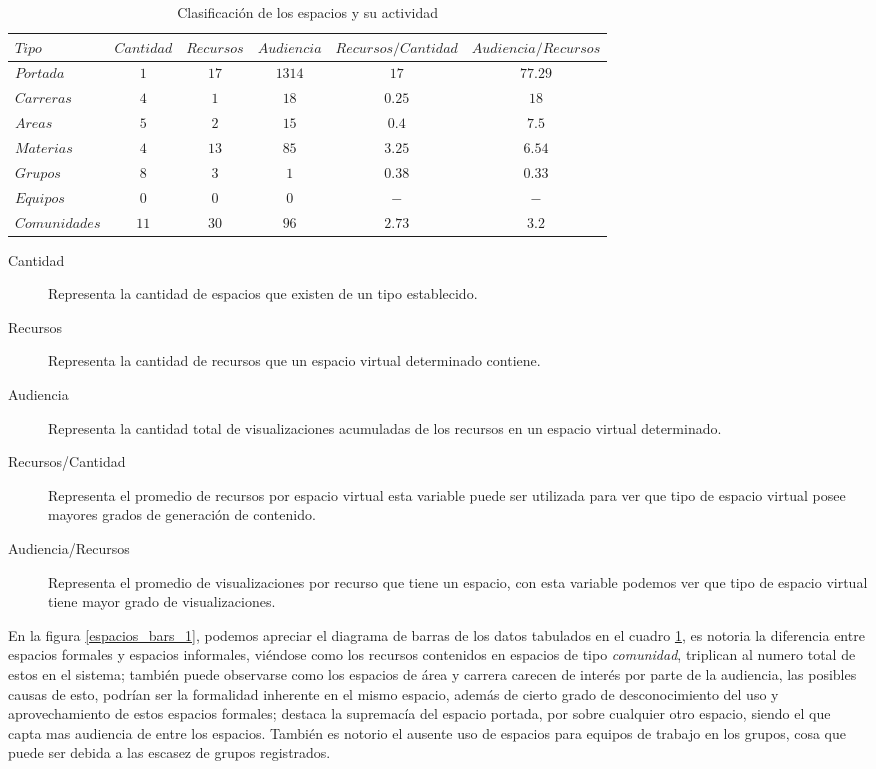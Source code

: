 \begin{table}
\centering
\begin{tabular}{l|c c c c c}
$Tipo$ & $Cantidad$ & $Recursos$ & $Audiencia$ &
$Recursos/Cantidad$ & $Audiencia/Recursos$ \\
\hline
$Portada    $ & $ 1$ & $17$ & $1314$ & $17   $ & $77.29$ \\
$Carreras   $ & $ 4$ & $ 1$ & $  18$ & $ 0.25$ & $18   $ \\
$Areas      $ & $ 5$ & $ 2$ & $  15$ & $ 0.4 $ & $ 7.5 $ \\
$Materias   $ & $ 4$ & $13$ & $  85$ & $ 3.25$ & $ 6.54$ \\
$Grupos     $ & $ 8$ & $ 3$ & $   1$ & $ 0.38$ & $ 0.33$ \\
$Equipos    $ & $ 0$ & $ 0$ & $   0$ & $    -$ & $ -   $ \\
$Comunidades$ & $11$ & $30$ & $  96$ & $ 2.73$ & $ 3.2 $ \\
\end{tabular}
\caption{Clasificación de los espacios y su actividad}
\label{espacios_tabla_1}
\end{table}

\begin{description}
\item [Cantidad] Representa la cantidad de espacios que existen de un tipo
establecido.
\item [Recursos] Representa la cantidad de recursos que un espacio virtual
determinado contiene.
\item [Audiencia] Representa la cantidad total de visualizaciones acumuladas de
los recursos en un espacio virtual determinado.
\item [Recursos/Cantidad] Representa el promedio de recursos por espacio virtual
esta variable puede ser utilizada para ver que tipo de espacio virtual posee
mayores grados de generación de contenido.
\item [Audiencia/Recursos] Representa el promedio de visualizaciones por recurso
que tiene un espacio, con esta variable podemos ver que tipo de espacio virtual
tiene mayor grado de visualizaciones.
\end{description}

En la figura \ref{espacios_bars_1}, podemos apreciar el diagrama de barras de
los datos tabulados en el cuadro \ref{espacios_tabla_1}, es notoria la
diferencia entre espacios formales y espacios informales, viéndose como los
recursos contenidos en espacios de tipo \emph{comunidad}, triplican al numero
total de estos en el sistema; también puede observarse como los espacios de área
y carrera carecen de interés por parte de la audiencia, las posibles causas de
esto, podrían ser la formalidad inherente en el mismo espacio, además de cierto
grado de desconocimiento del uso y aprovechamiento de estos espacios formales;
destaca la supremacía del espacio portada, por sobre cualquier otro espacio,
siendo el que capta mas audiencia de entre los espacios. También es notorio el
ausente uso de espacios para equipos de trabajo en los grupos, cosa que puede
ser debida a las escasez de grupos registrados.

